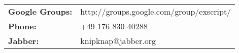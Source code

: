 \begin{tabular}{ll}
{\bf Google Groups:} & http://groups.google.com/group/exscript/ \\
{\bf Phone:}         & +49 176 830 40288 \\
{\bf Jabber:}        & knipknap@jabber.org
\end{tabular}
